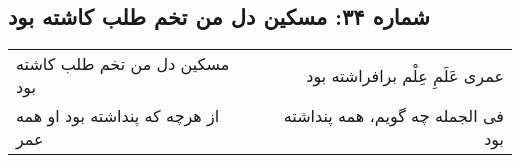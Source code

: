 \begin{center}
\section*{شماره ۳۴: مسکین دل من تخم طلب کاشته بود}
\label{sec:034}
\begin{longtable}{l p{0.5cm} r}
مسکین دل من تخم طلب کاشته بود
&&
عمری عَلَمِ عِلْم برافراشته بود
\\
از هرچه که پنداشته بود او همه عمر
&&
فی الجمله چه گویم، همه پنداشته بود
\\
\end{longtable}
\end{center}
